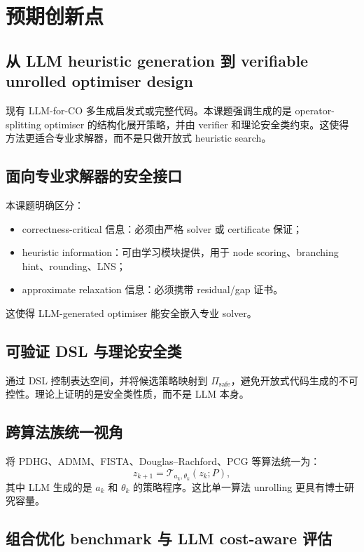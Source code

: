 \documentclass[UTF8,a4paper,12pt,fontset=fandol]{ctexart}
\begin{document}
\section{预期创新点}

\subsection{从 LLM heuristic generation 到 verifiable unrolled optimiser design}

现有 LLM-for-CO 多生成启发式或完整代码。本课题强调生成的是 operator-splitting optimiser 的结构化展开策略，并由 verifier 和理论安全类约束。这使得方法更适合专业求解器，而不是只做开放式 heuristic search。

\subsection{面向专业求解器的安全接口}

本课题明确区分：
\begin{itemize}[leftmargin=2em]
    \item correctness-critical 信息：必须由严格 solver 或 certificate 保证；
    \item heuristic information：可由学习模块提供，用于 node scoring、branching hint、rounding、LNS；
    \item approximate relaxation 信息：必须携带 residual/gap 证书。
\end{itemize}
这使得 LLM-generated optimiser 能安全嵌入专业 solver。

\subsection{可验证 DSL 与理论安全类}

通过 DSL 控制表达空间，并将候选策略映射到 $\Pi_{\text{safe}}$，避免开放式代码生成的不可控性。理论上证明的是安全类性质，而不是 LLM 本身。

\subsection{跨算法族统一视角}

将 PDHG、ADMM、FISTA、Douglas--Rachford、PCG 等算法统一为：
\begin{equation}
z_{k+1}=\mathcal{T}_{a_k,\theta_k}(z_k;P),
\end{equation}
其中 LLM 生成的是 $a_k$ 和 $\theta_k$ 的策略程序。这比单一算法 unrolling 更具有博士研究容量。

\subsection{组合优化 benchmark 与 LLM cost-aware 评估}
\end{document}
